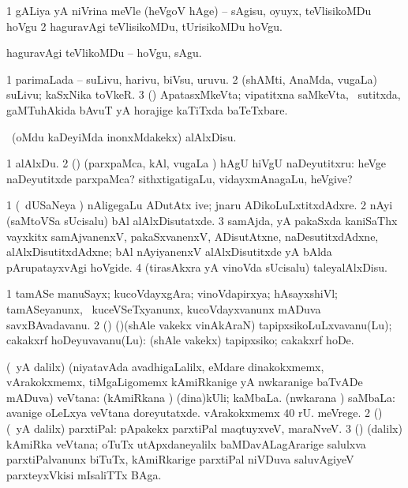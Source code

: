 \bentry
{} 
\gl{\sakirx}
\expl{}
\bmng
\bnum
\num{1} gALiya yA niVrina meVle (heVgoV hAge) -- sAgisu, oyuyx, teVlisikoMDu hoVgu 
\num{2} haguravAgi teVlisikoMDu, tUrisikoMDu hoVgu. 
\enum
\emng

\noindent 
\gl{\akirx}
\expl{}
\bmng
haguravAgi teVlikoMDu -- hoVgu, sAgu. 
\emng
\eentry

\bentry
{} 
\gl{\nA}
\expl{}
\bmng
\bnum
\num{1} parimaLada -- suLivu, harivu, biVsu, uruvu. 
\num{2} (shAMti, AnaMda, \mo vugaLa) suLivu; kaSxNika toVkeR. 
\hypertarget{waft(2)3}{} 
\num{3} (\nw) ApatasxMkeVta; vipatitxna saMkeVta, \udA\ sutitxda, gaMTuhAkida bAvuT yA horajige kaTiTxda baTeTxbare. 
\enum
\emng
\eentry

\bentry
{} 
\gl{\kirx}
\bmng
 \sakirx\ (oMdu kaDeyiMda inonxMdakekx) alAlxDisu. 
\emng

\noindent 
\gl{\akirx}
\expl{}
\bmng
\bnum
\num{1} alAlxDu. 
\num{2} (\pArxparx) (parxpaMca, kAl, \mo vugaLa \vi) hAgU hiVgU naDeyutitxru:  heVge naDeyutitxde parxpaMca? sithxtigatigaLu, vidayxmAnagaLu, heVgive? 
\enum
\emng

\noindent 
\gl{\pagu}
\expl{}
\bmng
\bnum
\num{1}  (\kanmu\ dUSaNeya \vi) nAligegaLu ADutAtx ive; jnaru ADikoLuLxtitxdAdxre. 
\num{2}  nAyi (saMtoVSa sUcisalu) bAl alAlxDisutatxde. 
\num{3}  samAjda, yA pakaSxda kaniSaThx vayxkitx samAjvanenxV, pakaSxvanenxV, ADisutAtxne, naDesutitxdAdxne, alAlxDisutitxdAdxne; bAl nAyiyanenxV alAlxDisutitxde yA bAlda pArupatayxvAgi hoVgide. 
\num{4}  (tirasAkxra yA vinoVda sUcisalu) taleyalAlxDisu. 
\enum
\emng
\eentry

 
\bentry
{}
\gl{\nA}
\expl{}
\bmng
\bnum
\num{1} tamASe manuSayx; kucoVdayxgAra; vinoVdapirxya; hAsayxshiVl; tamASeyanunx, \kanmu\ kuceVSeTxyanunx, kucoVdayxvanunx mADuva savxBAvadavanu. 
\num{2} (\ashi) (\birx)(shAle \mo vakekx vinAkAraN) tapipxsikoLuLxvavanu(Lu); cakakxrf hoDeyuvavanu(Lu):  (shAle \mo vakekx) tapipxsiko; cakakxrf hoDe. 
\enum
\emng
\eentry

\bentry
{} 
\gl{\nA}
\expl{}
\bmng
\bnum
{} (\Eva\ yA \bava dalilx) (niyatavAda avadhigaLalilx, eMdare dinakokxmemx, vArakokxmemx, tiMgaLigomemx kAmiRkanige yA nwkaranige baTvADe mADuva) veVtana: 
\banum
{} (kAmiRkana \vi) (dina)kUli; kaMbaLa. 
 (nwkarana \vi) saMbaLa:  avanige oLeLxya veVtana doreyutatxde.  vArakokxmemx $40$ rU. meVrege. 
\eanum
\numie
\num{2} (\rUpa) (\Eva\ yA \bava dalilx) parxtiPal:  pApakekx parxtiPal maqtuyxveV, maraNveV. 
\num{3} (\athaRshA) (\bava dalilx) kAmiRka veVtana; oTuTx utApxdaneyalilx baMDavALagArarige salulxva parxtiPalvanunx biTuTx, kAmiRkarige parxtiPal niVDuva saluvAgiyeV parxteyxVkisi mIsaliTTx BAga. 
\enum
\emng

